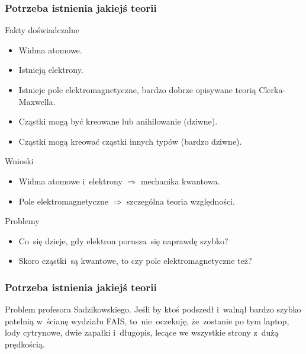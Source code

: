 \documentclass[10pt,t]{beamer}
\begin{document}
\begin{frame}
  \frametitle{Potrzeba istnienia jakiejś teorii}


  Fakty doświadczalne
  \begin{itemize}

  \item Widma atomowe.

  \item Istnieją elektrony.

  \item Istnieje pole elektromagnetyczne, bardzo dobrze
    opisywane teorią Clerka-Maxwella.

  \item Cząstki mogą być kreowane lub anihilowanie (dziwne).

  \item Cząstki mogą kreować cząstki innych typów (bardzo
    dziwne).

  \end{itemize}

  Wnioski
  \begin{itemize}

  \item Widma atomowe i~elektrony $\Rightarrow$ mechanika kwantowa.

  \item Pole elektromagnetyczne $\Rightarrow$ szczególna teoria względności.

  \end{itemize}



  Problemy
  \begin{itemize}

  \item Co~się dzieje, gdy elektron porusza~się naprawdę szybko?

  \item Skoro cząstki~są kwantowe, to czy pole elektromagnetyczne też?

  \end{itemize}

\end{frame}





\begin{frame}
  \frametitle{Potrzeba istnienia jakiejś teorii}


  Problem profesora Sadzikowskiego.
  Jeśli by ktoś podszedł i~walnął bardzo szybko patelnią w~ścianę
  wydziału FAIS, to~nie~oczekuję, że~zostanie po tym laptop, lody
  cytrynowe, dwie zapałki i~długopis, lecące we wszystkie strony z~dużą
  prędkością.

\end{frame}
\end{document}
